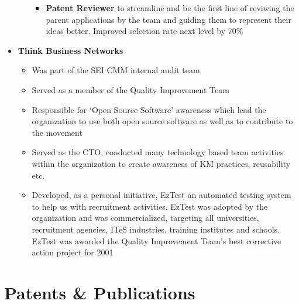 \documentclass[a4paper,12pt]{article}
\begin{document}
\begin{itemize}
\begin{itemize}
\begin{itemize}
      \item \textbf{Patent Reviewer} to streamline and be the first
        line of reviwing the parent applications by the team and
        guiding them to represent their ideas better. Improved
        selection rate next level by 70\%

      \end{itemize}
      
    \end{itemize}

  \item{\textbf{Think Business Networks}}

    \begin{itemize}
      
      \setlength\itemsep{-0.5em}
      
      \item Was part of the SEI CMM internal audit team 

      \item Served as a member of the Quality Improvement Team 

      \item Responsible for `Open Source Software' awareness which 
        lead the organization to use both open source software as well
        as to contribute to the movement

      \item Served as the CTO, conducted many technology based team
        activities within the organization to create awareness of KM
        practices, reusability etc.

      \item Developed, as a personal initiative, EzTest an automated
        testing system to help us with recruitment activities. EzTest
        was adopted by the organization and was commercialized,
        targeting all universities, recruitment agencies, ITeS
        industries, training institutes and schools. EzTest was
        awarded the Quality Improvement Team's best corrective action
        project for 2001
        
    \end{itemize}
\end{itemize}

\section*{Patents \& Publications}
\end{document}
